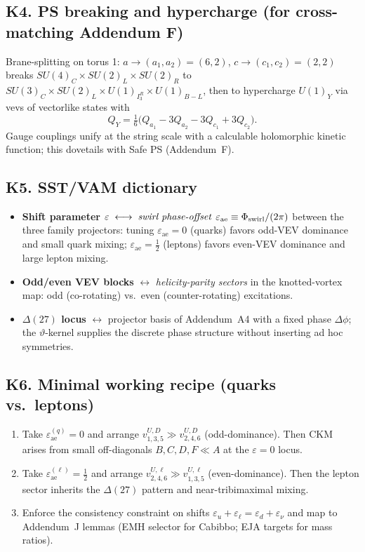 \documentclass[11pt]{article}
\begin{document}
  \subsection*{K4. PS breaking and hypercharge (for cross-matching Addendum F)}
      Brane-splitting on torus 1:
      $a\rightarrow(a_1,a_2)=(6,2)$, $c\rightarrow(c_1,c_2)=(2,2)$ breaks
      $SU(4)_C\times SU(2)_L\times SU(2)_R$ to
      $SU(3)_C\times SU(2)_L\times U(1)_{I_3^R}\times U(1)_{B-L}$,
      then to hypercharge $U(1)_Y$ via vevs of vectorlike states with
      \[
          Q_Y=\tfrac16\bigl(Q_{a_1}-3Q_{a_2}-3Q_{c_1}+3Q_{c_2}\bigr).
      \]
      Gauge couplings unify at the string scale with a calculable holomorphic kinetic function; this dovetails with Safe PS (Addendum~F).

  \subsection*{K5. SST/VAM dictionary}
      \begin{itemize}
      \item \textbf{Shift parameter} $\varepsilon\;\longleftrightarrow\;
      \emph{swirl phase-offset}$ $\varepsilon_{\text{ae}}\equiv \Phi_{\rm swirl}/(2\pi)$ between the three family projectors:
      tuning $\varepsilon_{\text{ae}}=0$ (quarks) favors odd-VEV dominance and small quark mixing;
      $\varepsilon_{\text{ae}}=\tfrac12$ (leptons) favors even-VEV dominance and large lepton mixing.
      \item \textbf{Odd/even VEV blocks} $\longleftrightarrow$
      \emph{helicity-parity sectors} in the knotted-vortex map: odd (co-rotating) vs.\ even (counter-rotating) excitations.
      \item \textbf{$\Delta(27)$ locus} $\longleftrightarrow$
      projector basis of Addendum~A4 with a fixed phase $\Delta\phi$; the $\vartheta$-kernel supplies the discrete
      phase structure without inserting ad hoc symmetries.
      \end{itemize}

  \subsection*{K6. Minimal working recipe (quarks vs.\ leptons)}
      \begin{enumerate}
      \item Take $\varepsilon_{\text{ae}}^{(q)}=0$ and arrange $v^{U,D}_{1,3,5}\gg v^{U,D}_{2,4,6}$ (odd-dominance). Then CKM arises from small off-diagonals $B,C,D,F\ll A$ at the $\varepsilon=0$ locus.
      \item Take $\varepsilon_{\text{ae}}^{(\ell)}=\tfrac12$ and arrange $v^{U,\ell}_{2,4,6}\gg v^{U,\ell}_{1,3,5}$ (even-dominance). Then the lepton sector inherits the $\Delta(27)$ pattern and near-tribimaximal mixing.
      \item Enforce the consistency constraint on shifts $\varepsilon_u+\varepsilon_\ell=\varepsilon_d+\varepsilon_\nu$ and map to Addendum~J lemmas (EMH selector for Cabibbo; EJA targets for mass ratios).
      \end{enumerate}
\end{document}
